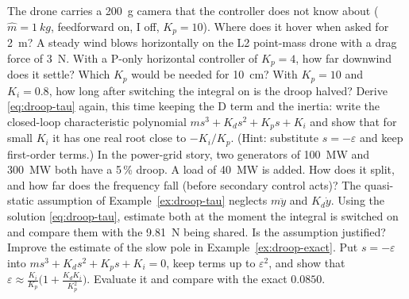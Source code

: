 \begin{exercises}
\exercise[1] The drone carries a \SI{200}{g} camera that the controller does not know about ($\hat m = \SI{1}{kg}$, feedforward on, I off, $K_p = 10$). Where does it hover when asked for \SI{2}{m}?
\exercise[1] A steady wind blows horizontally on the L2 point-mass drone with a drag force of \SI{3}{N}. With a P-only horizontal controller of $K_p = 4$, how far downwind does it settle? Which $K_p$ would be needed for \SI{10}{cm}?
\exercise[1] With $K_p = 10$ and $K_i = 0.8$, how long after switching the integral on is the droop halved?
\exercise[2] Derive \cref{eq:droop-tau} again, this time keeping the D term and the inertia: write the closed-loop characteristic polynomial $m s^3 + K_d s^2 + K_p s + K_i$ and show that for small $K_i$ it has one real root close to $-K_i/K_p$. (Hint: substitute $s = -\varepsilon$ and keep first-order terms.)
\exercise[2] In the power-grid story, two generators of \SI{100}{MW} and \SI{300}{MW} both have a 5\,\% droop. A load of \SI{40}{MW} is added. How does it split, and how far does the frequency fall (before secondary control acts)?
\exercise[3] The quasi-static assumption of Example~\ref{ex:droop-tau} neglects $m\ddot y$ and $K_d\dot y$. Using the solution \eqref{eq:droop-tau}, estimate both at the moment the integral is switched on and compare them with the \SI{9.81}{N} being shared. Is the assumption justified?
\exercise[2] Improve the estimate of the slow pole in Example~\ref{ex:droop-exact}. Put $s = -\varepsilon$ into $m s^3 + K_d s^2 + K_p s + K_i = 0$, keep terms up to $\varepsilon^2$, and show that $\varepsilon \approx \frac{K_i}{K_p}\big(1 + \frac{K_d K_i}{K_p^2}\big)$. Evaluate it and compare with the exact $0.0850$.

\end{exercises}
